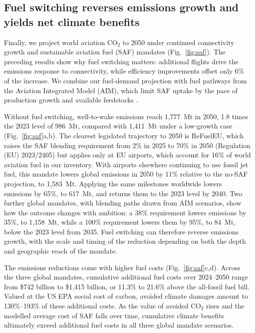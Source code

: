 \documentclass[12pt]{extarticle}
\begin{document}
\subsection*{Fuel switching reverses emissions growth and yields net climate benefits}
Finally, we project world aviation CO$_2$ to 2050 under continued connectivity growth and sustainable aviation fuel (SAF) mandates (Fig.~\ref{fig:saf}). The preceding results show why fuel switching matters: additional flights drive the emissions response to connectivity, while efficiency improvements offset only 6\% of the increase. We combine our fuel-demand projection with fuel pathways from the Aviation Integrated Model (AIM), which limit SAF uptake by the pace of production growth and available feedstocks \citep{dray2019aim2015,dray2022}.

Without fuel switching, well-to-wake emissions reach 1,777~Mt in 2050, 1.8 times the 2023 level of 986~Mt, compared with 1,411~Mt under a low-growth case (Fig.~\ref{fig:saf}a,b). The clearest legislated trajectory to 2050 is ReFuelEU, which raises the SAF blending requirement from 2\% in 2025 to 70\% in 2050 (Regulation (EU) 2023/2405) but applies only at EU airports, which account for 16\% of world aviation fuel in our inventory. With airports elsewhere continuing to use fossil jet fuel, this mandate lowers global emissions in 2050 by 11\% relative to the no-SAF projection, to 1,583~Mt. Applying the same milestones worldwide lowers emissions by 65\%, to 617~Mt, and returns them to the 2023 level by 2040. Two further global mandates, with blending paths drawn from AIM scenarios, show how the outcome changes with ambition: a 38\% requirement lowers emissions by 35\%, to 1,158~Mt, while a 100\% requirement lowers them by 95\%, to 84~Mt, below the 2023 level from 2035. Fuel switching can therefore reverse emissions growth, with the scale and timing of the reduction depending on both the depth and geographic reach of the mandate.

The emissions reductions come with higher fuel costs (Fig.~\ref{fig:saf}c,d). Across the three global mandates, cumulative additional fuel costs over 2024--2050 range from \$742 billion to \$1,415 billion, or 11.3\% to 21.6\% above the all-fossil fuel bill. Valued at the US EPA social cost of carbon, avoided climate damages amount to 130\%--193\% of these additional costs. As the value of avoided CO$_2$ rises and the modelled average cost of SAF falls over time, cumulative climate benefits ultimately exceed additional fuel costs in all three global mandate scenarios.
\end{document}
